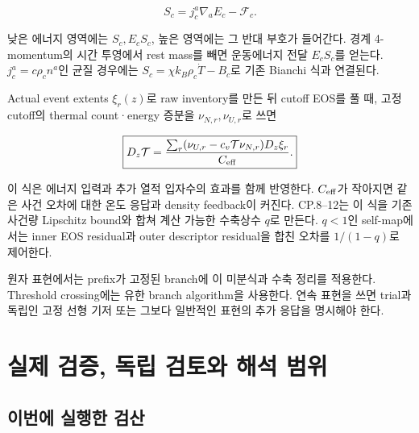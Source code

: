 \documentclass[11pt,a4paper]{article}
\begin{document}
\[
\boxed{S_c=j_c^a\nabla_aE_c-\mathcal F_c.}
\]

낮은 에너지 영역에는 \(S_c,E_cS_c\), 높은 영역에는 그 반대 부호가 들어간다. 경계 4-momentum의 시간 투영에서 rest mass를 빼면 운동에너지 전달 \(E_cS_c\)를 얻는다. \(j_c^a=c\rho_cn^a\)인 균질 경우에는 \(S_c=\chi k_B\rho_c\dot T-B_c\)로 기존 Bianchi 식과 연결된다.

Actual event extents \(\xi_r(z)\)로 raw inventory를 만든 뒤 cutoff EOS를 풀 때, 고정 cutoff의 thermal count·energy 증분을 \(\nu_{N,r},\nu_{U,r}\)로 쓰면

\[
\boxed{D_z\mathcal T=
\frac{\sum_r(\nu_{U,r}-c_v\mathcal T\nu_{N,r})D_z\xi_r}{C_{\rm eff}}.}
\]

이 식은 에너지 입력과 추가 열적 입자수의 효과를 함께 반영한다. \(C_{\rm eff}\)가 작아지면 같은 사건 오차에 대한 온도 응답과 density feedback이 커진다. CP.8--12는 이 식을 기존 사건량 Lipschitz bound와 합쳐 계산 가능한 수축상수 \(q\)로 만든다. \(q<1\)인 self-map에서는 inner EOS residual과 outer descriptor residual을 합친 오차를 \(1/(1-q)\)로 제어한다.

원자 표현에서는 prefix가 고정된 branch에 이 미분식과 수축 정리를 적용한다. Threshold crossing에는 유한 branch algorithm을 사용한다. 연속 표현을 쓰면 trial과 독립인 고정 선형 기저 또는 그보다 일반적인 표현의 추가 응답을 명시해야 한다.

\hypertarget{uxc2e4uxc81c-uxac80uxc99d-uxb3c5uxb9bd-uxac80uxd1a0uxc640-uxd574uxc11d-uxbc94uxc704}{%
\section{실제 검증, 독립 검토와 해석 범위}\label{uxc2e4uxc81c-uxac80uxc99d-uxb3c5uxb9bd-uxac80uxd1a0uxc640-uxd574uxc11d-uxbc94uxc704}}

\hypertarget{uxc774uxbc88uxc5d0-uxc2e4uxd589uxd55c-uxac80uxc0b0}{%
\subsection{이번에 실행한 검산}\label{uxc774uxbc88uxc5d0-uxc2e4uxd589uxd55c-uxac80uxc0b0}}
\end{document}
